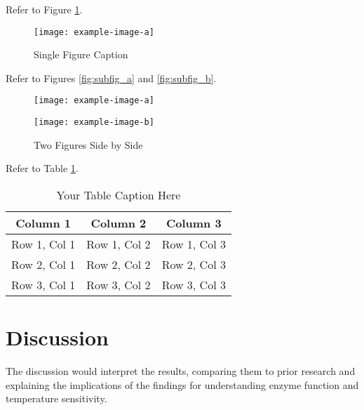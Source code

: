\documentclass[a4paper]{article} 	%
\begin{document}
Refer to Figure \ref{fig:single_figure}. 

\begin{figure}[H]
    \centering
    \texttt{[image: example-image-a]}
    \caption{Single Figure Caption}
    \label{fig:single_figure}
\end{figure}


Refer to Figures \ref{fig:subfig_a} and \ref{fig:subfig_b}. 

\begin{figure}[H]
    \centering
    \begin{minipage}{0.45\textwidth}
        \centering
        \texttt{[image: example-image-a]}
        \label{fig:subfig_a}
    \end{minipage}%
    \hfill
    \begin{minipage}{0.45\textwidth}
        \centering
        \texttt{[image: example-image-b]}
        \label{fig:subfig_b}
    \end{minipage}
    \caption{Two Figures Side by Side}
    \label{fig:two_figures}
\end{figure}




Refer to Table \ref{tab:my_table}. 

\begin{table}[H] %
    \centering
    \begin{tabular}{ccc}
        \toprule
        \textbf{Column 1} & \textbf{Column 2} & \textbf{Column 3} \\ \midrule
        Row 1, Col 1 & Row 1, Col 2 & Row 1, Col 3 \\
        Row 2, Col 1 & Row 2, Col 2 & Row 2, Col 3 \\
        Row 3, Col 1 & Row 3, Col 2 & Row 3, Col 3 \\
        \bottomrule
    \end{tabular}
    \caption{Your Table Caption Here}
    \label{tab:my_table}
\end{table}


\section{Discussion}
The discussion would interpret the results, comparing them to prior research and explaining the implications of the findings for understanding enzyme function and temperature sensitivity.
\end{document}

